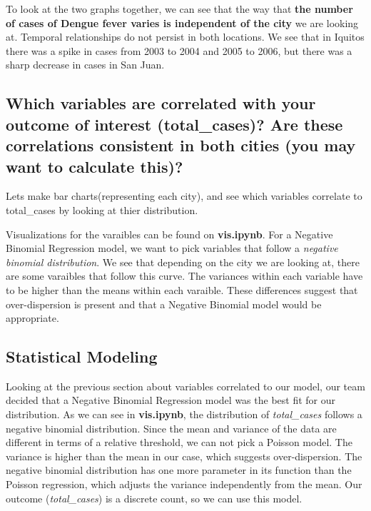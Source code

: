 \documentclass[11pt]{article}
\begin{document}
    To look at the two graphs together, we can see that the way that
\textbf{the number of cases of Dengue fever varies is independent of the
city} we are looking at. Temporal relationships do not persist in both
locations. We see that in Iquitos there was a spike in cases from 2003
to 2004 and 2005 to 2006, but there was a sharp decrease in cases in San
Juan.

    \subsection{Which variables are correlated with your outcome of interest
(total\_cases)? Are these correlations consistent in both cities (you
may want to calculate
this)?}\label{which-variables-are-correlated-with-your-outcome-of-interest-total_cases-are-these-correlations-consistent-in-both-cities-you-may-want-to-calculate-this}

Lets make bar charts(representing each city), and see which variables
correlate to total\_cases by looking at thier distribution.

    Visualizations for the varaibles can be found on \textbf{vis.ipynb}. For
a Negative Binomial Regression model, we want to pick variables that
follow a \emph{negative binomial distribution}. We see that depending on
the city we are looking at, there are some varaibles that follow this
curve. The variances within each variable have to be higher than the
means within each varaible. These differences suggest that
over-dispersion is present and that a Negative Binomial model would be
appropriate.

    \subsection{Statistical Modeling}\label{statistical-modeling}

    Looking at the previous section about variables correlated to our model,
our team decided that a Negative Binomial Regression model was the best
fit for our distribution. As we can see in \textbf{vis.ipynb}, the
distribution of \emph{total\_cases} follows a negative binomial
distribution. Since the mean and variance of the data are different in
terms of a relative threshold, we can not pick a Poisson model. The
variance is higher than the mean in our case, which suggests
over-dispersion. The negative binomial distribution has one more
parameter in its function than the Poisson regression, which adjusts the
variance independently from the mean. Our outcome (\emph{total\_cases})
is a discrete count, so we can use this model.
\end{document}
